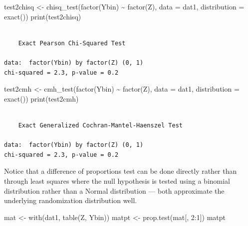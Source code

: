 \documentclass[
  12pt,
]{book}
\newenvironment{Shaded}{\begin{snugshade}}{\end{snugshade}}
\newcommand{\AttributeTok}[1]{\textcolor[rgb]{0.77,0.63,0.00}{#1}}
\newcommand{\DecValTok}[1]{\textcolor[rgb]{0.00,0.00,0.81}{#1}}
\newcommand{\FunctionTok}[1]{\textcolor[rgb]{0.00,0.00,0.00}{#1}}
\newcommand{\NormalTok}[1]{#1}
\newcommand{\OtherTok}[1]{\textcolor[rgb]{0.56,0.35,0.01}{#1}}
\newcommand{\SpecialCharTok}[1]{\textcolor[rgb]{0.00,0.00,0.00}{#1}}
\theoremstyle{definition}
\theoremstyle{definition}
\theoremstyle{definition}
\theoremstyle{remark}
\begin{document}
\begin{Shaded}
\begin{Highlighting}[]
\NormalTok{test2chisq }\OtherTok{\textless{}{-}} \FunctionTok{chisq\_test}\NormalTok{(}\FunctionTok{factor}\NormalTok{(Ybin) }\SpecialCharTok{\textasciitilde{}} \FunctionTok{factor}\NormalTok{(Z), }\AttributeTok{data =}\NormalTok{ dat1, }\AttributeTok{distribution =} \FunctionTok{exact}\NormalTok{())}
\FunctionTok{print}\NormalTok{(test2chisq)}
\end{Highlighting}
\end{Shaded}

\begin{verbatim}

    Exact Pearson Chi-Squared Test

data:  factor(Ybin) by factor(Z) (0, 1)
chi-squared = 2.3, p-value = 0.2
\end{verbatim}

\begin{Shaded}
\begin{Highlighting}[]
\NormalTok{test2cmh }\OtherTok{\textless{}{-}} \FunctionTok{cmh\_test}\NormalTok{(}\FunctionTok{factor}\NormalTok{(Ybin) }\SpecialCharTok{\textasciitilde{}} \FunctionTok{factor}\NormalTok{(Z), }\AttributeTok{data =}\NormalTok{ dat1, }\AttributeTok{distribution =} \FunctionTok{exact}\NormalTok{())}
\FunctionTok{print}\NormalTok{(test2cmh)}
\end{Highlighting}
\end{Shaded}

\begin{verbatim}

    Exact Generalized Cochran-Mantel-Haenszel Test

data:  factor(Ybin) by factor(Z) (0, 1)
chi-squared = 2.3, p-value = 0.2
\end{verbatim}

Notice that a difference of proportions test can be done directly rather
than through least squares where the null hypothesis is tested using a
binomial distribution rather than a Normal distribution --- both
approximate the underlying randomization distribution well.

\begin{Shaded}
\begin{Highlighting}[]
\NormalTok{mat }\OtherTok{\textless{}{-}} \FunctionTok{with}\NormalTok{(dat1, }\FunctionTok{table}\NormalTok{(Z, Ybin))}
\NormalTok{matpt }\OtherTok{\textless{}{-}} \FunctionTok{prop.test}\NormalTok{(mat[, }\DecValTok{2}\SpecialCharTok{:}\DecValTok{1}\NormalTok{])}
\NormalTok{matpt}
\end{Highlighting}
\end{Shaded}
\end{document}
